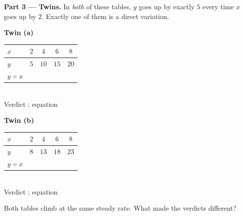 \documentclass[10pt]{article}
\begin{document}
\begin{tcolorbox}[colback=white, colframe=black!40, title=\textbf{Tier R --- Remediate},
    fonttitle=\bfseries, arc=1.5mm, left=3mm, right=3mm, top=2mm, bottom=2mm, breakable]
\vspace{5pt}
\textbf{Part 3 --- Twins.} In \emph{both} of these tables, $y$ goes up by exactly $5$ every time $x$
goes up by $2$. Exactly one of them is a direct variation.
\begin{center}
\begin{minipage}{0.47\linewidth}\centering
\textbf{Twin (a)}\\[2pt]
\renewcommand{\arraystretch}{1.25}
\begin{tabular}{|l|c|c|c|c|}
\hline
\rowcolor{forestbg}
$x$ & $2$ & $4$ & $6$ & $8$ \\ \hline
$y$ & $5$ & $10$ & $15$ & $20$ \\ \hline
$y\div x$ & & & & \\ \hline
\end{tabular}\\[3pt]
{\small Verdict \blank{2.0cm}; \; equation \blank{2.0cm}}
\end{minipage}\hfill
\begin{minipage}{0.47\linewidth}\centering
\textbf{Twin (b)}\\[2pt]
\renewcommand{\arraystretch}{1.25}
\begin{tabular}{|l|c|c|c|c|}
\hline
\rowcolor{forestbg}
$x$ & $2$ & $4$ & $6$ & $8$ \\ \hline
$y$ & $8$ & $13$ & $18$ & $23$ \\ \hline
$y\div x$ & & & & \\ \hline
\end{tabular}\\[3pt]
{\small Verdict \blank{2.0cm}; \; equation \blank{2.0cm}}
\end{minipage}
\end{center}
\vspace{-2pt}
Both tables climb at the same steady rate. What made the verdicts different? \writeline
\end{tcolorbox}
\end{document}
